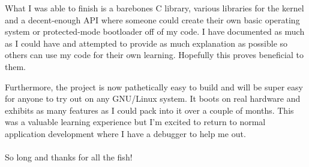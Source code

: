 \documentclass[a4paper,10pt]{article}
\begin{document}
What I was able to finish is a barebones C library, various libraries for the kernel and a decent-enough API where someone could create their own basic operating system or protected-mode bootloader off of my code. I have documented as much as I could have and attempted to provide as much explanation as possible so others can use my code for their own learning. Hopefully this proves beneficial to them.

Furthermore, the project is now pathetically easy to build and will be super easy for anyone to try out on any GNU/Linux system. It boots on real hardware and exhibits as many features as I could pack into it over a couple of months. This was a valuable learning experience but I'm excited to return to normal application development where I have a debugger to help me out.
\\\\
So long and thanks for all the fish!
\end{document}
